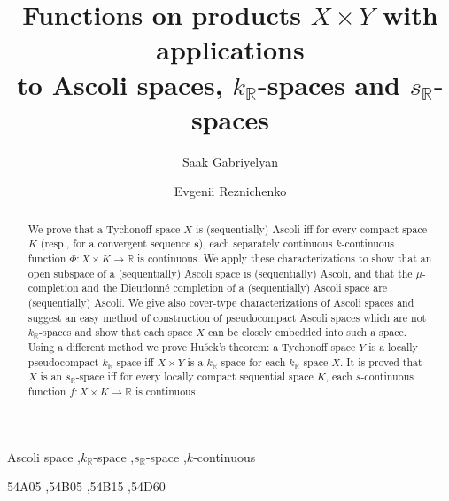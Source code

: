 \documentclass[preprint,11pt]{elsarticle}
\numberwithin{equation}{section}
\numberwithin{theorem}{section}
\newcommand{\IR}{\mathbb{R}}
\begin{document}
\begin{frontmatter}


\title{Functions on products $X \times Y$ with applications \\ to  Ascoli spaces, $k_\IR$-spaces and $s_\IR$-spaces}


\author{Saak Gabriyelyan}%
\address{Department of Mathematics, Ben-Gurion University of the Negev, Beer-Sheva, Israel}

\author{Evgenii Reznichenko}%
\address{Department of Mathematics, Lomonosov Mosow State University, Moscow, Russia}


\begin{abstract}
We prove that a Tychonoff space $X$ is (sequentially) Ascoli iff  for every compact space $K$ (resp., for a convergent sequence $\mathbf{s}$), each separately continuous $k$-continuous function $\Phi:X\times K\to \IR$ is continuous. We apply these characterizations to show that an open subspace of a (sequentially) Ascoli space is (sequentially) Ascoli, and that the $\mu$-completion and the Dieudonn\'{e} completion of a (sequentially)  Ascoli space are (sequentially) Ascoli. We give also cover-type characterizations of Ascoli spaces and suggest an easy method of construction of pseudocompact Ascoli spaces which are not $k_\IR$-spaces and show that each space $X$ can be closely embedded into such a space. Using a different method we prove Hu\v{s}ek's theorem: a Tychonoff space $Y$ is a locally pseudocompact $k_\IR$-space iff $X\times Y$ is a $k_\IR$-space for each $k_\IR$-space $X$. It is proved that $X$ is an $s_\IR$-space iff  for every locally compact sequential space $K$,  each $s$-continuous function $f:X\times K\to\IR$ is continuous.
\end{abstract}

\begin{keyword}
Ascoli space \sep $k_\IR$-space \sep $s_\IR$-space \sep  $k$-continuous


\MSC[2010] 54A05 \sep  54B05 \sep  54B15 \sep 54D60

\end{keyword}

\end{frontmatter}

\end{document}
